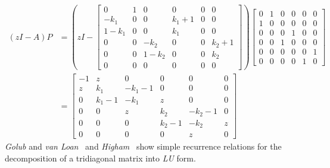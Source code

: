 \documentclass[a4paper,twoside,10pt,english]{article}
\begin{document}
\begin{align*}
\left(zI-A\right)P &=  \left(zI-\left[\begin{array}{cccccc}
    0     & 1 &   0     &   0     & 0 &   0     \\
   -k_{1}  & 0 &   0     & k_{1}+1 & 0 &   0     \\
  1-k_{1}  & 0 &   0     &   k_{1} & 0 &   0     \\
    0      & 0 &  -k_{2} &   0    & 0 & k_{2}+1  \\
    0      & 0 & 1-k_{2} &   0    & 0 &   k_{2}  \\
    0      & 0 &   0     &   0   & 0 &   0  \end{array}\right]\right)
  \left[\begin{array}{cccccc}
    0 &   1     &   0     &   0     &   0     & 0  \\
    1 &   0     &   0     &   0     &   0     & 0  \\
    0 &   0     &   0     &   1     &   0     & 0  \\
    0 &   0     &   1     &   0     &   0     & 0  \\
    0 &   0     &   0     &   0     &   0     & 1  \\
    0 &   0     &   0     &   0     &   1     & 0  \end{array}\right] \\
    &= \left[\begin{array}{cccccc}
 -1  &   z      &   0       & 0      &    0       &  0 \\
  z  &  k_{1}   &  -k_{1}- 1 & 0      &    0       &  0 \\
  0  &  k_{1}-1 &  -k_{1}    &  z     &    0       &  0 \\
  0  &   0      &  z        & k_{2}   &  -k_{2}-1  &  0 \\
  0  &   0      &  0        & k_{2}-1 &  -k_{2}    &  z \\
  0  &   0      &  0        & 0       &   z       &  0  \end{array}\right]
\end{align*}
\emph{Golub} and
\emph{van Loan}~\cite[Section 4.3]{GolubVanLoan_MatrixComputations} and
\emph{Higham}~\cite[Section 9.6]{Higham_AccuracyStabilityNumericalAlgorithms}
show simple recurrence relations for the decomposition of a tridiagonal matrix
into \emph{LU} form. 
\end{document}
